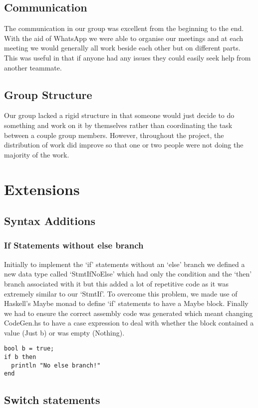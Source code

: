 \documentclass{article}
\begin{document}
\subsection{Communication}
The communication in our group was excellent from the beginning to the end. With the aid of WhatsApp we were able to organise our meetings and at each meeting we would generally all work beside each other but on different parts. This was useful in that if anyone had any issues they could easily seek help from another teammate. 

\subsection{Group Structure}
Our group lacked a rigid structure in that someone would just decide to do something and work on it by themselves rather than coordinating the task between a couple group members. However, throughout the project, the distribution of work did improve so that one or two people were not doing the majority of the work.


\section{Extensions}
\subsection{Syntax Additions}
\subsubsection{If Statements without else branch}
Initially to implement the `if' statements without an `else' branch we defined a new data type called `StmtIfNoElse' which had only the condition and the `then' branch associated with it but this added a lot of repetitive code as it was extremely similar to our `StmtIf'. To overcome this problem, we made use of Haskell's Maybe monad to  define `if' statements to have a Maybe block. Finally we had to ensure the correct assembly code was generated which meant changing CodeGen.hs to have a case expression to deal with whether the block contained a value (Just b) or was empty (Nothing).
\begin{lstlisting}
bool b = true;
if b then
  println "No else branch!"
end

\end{lstlisting}
\subsection{Switch statements}
\end{document}
